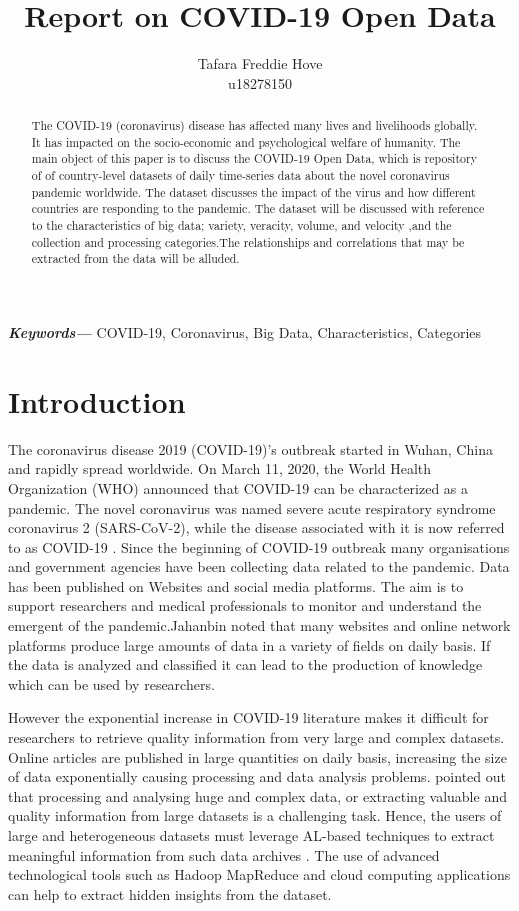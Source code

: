 \documentclass[12pt,letterpaper, twoside]{article}
\title{Report on COVID-19 Open Data}
\author{Tafara Freddie Hove \\
        \small u18278150 \\
}
\date{} %
\providecommand{\keywords}[1]
{
  \small	
  \textbf{\textit{Keywords---}} #1 
}
\begin{document}
\maketitle

\begin{abstract}
  The COVID-19 (coronavirus) disease has affected many lives and livelihoods globally. It has impacted on the socio-economic and psychological welfare of humanity.  The main object of this paper is to discuss the COVID-19 Open Data, which is repository of of country-level datasets of daily time-series data about the novel coronavirus pandemic worldwide. The dataset discusses the impact of the virus and how different countries are responding to the pandemic. The dataset will be discussed with reference to the characteristics of big data; variety, veracity, volume, and velocity ,and the collection and processing categories.The relationships and correlations that may be extracted from the data will be alluded.
\end{abstract}\hspace{10pt}

\keywords{COVID-19, Coronavirus, Big Data, Characteristics, Categories}
 
\section{Introduction}

The coronavirus disease 2019 (COVID-19)'s outbreak started in Wuhan, China and  rapidly spread worldwide. On March 11, 2020, the World Health Organization (WHO) announced that COVID-19 can be characterized as a pandemic\cite{Gao}. The novel coronavirus was named severe acute respiratory syndrome coronavirus 2 (SARS-CoV-2), while the disease associated with it is now referred to as COVID-19 \cite{Gao}. Since the beginning  of COVID-19 outbreak many organisations and government agencies have been collecting data related to the pandemic. Data has been published on Websites and social media platforms. The aim is to support researchers and medical professionals to monitor and understand the emergent of the pandemic.{Jahanbin} noted that many websites and online network platforms produce large amounts of data in a variety of fields on daily basis. If the data is analyzed and classified it can lead to the production of knowledge which can be used by researchers. 


However the exponential increase in COVID-19 literature makes it difficult for researchers to retrieve quality information from very large and complex datasets. Online articles are published in large quantities on daily basis, increasing the size of data exponentially causing processing and data analysis problems. \cite{Patel et al} pointed out that processing and analysing huge and complex data, or extracting valuable and quality information from large datasets is a challenging task. Hence, the users of large and heterogeneous datasets must leverage AL-based techniques to extract meaningful information from such data archives \cite{Wang et al}. The use of advanced technological tools such as Hadoop MapReduce  and cloud computing applications can help to extract hidden insights from the dataset. 
\end{document}

